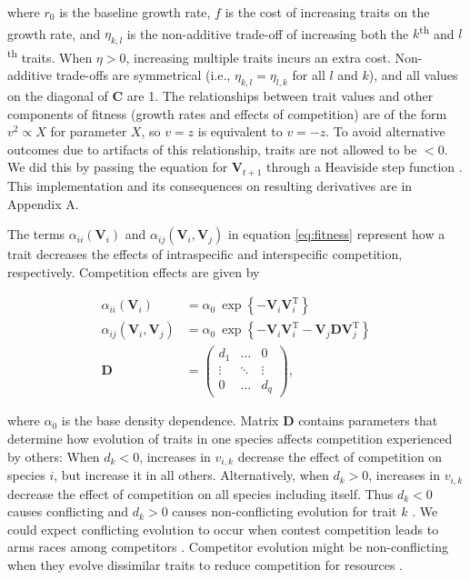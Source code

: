 \noindent where $r_0$ is the baseline growth rate,
$f$ is the cost of increasing traits on the growth rate, and
$\eta_{k,l}$ is the non-additive trade-off of increasing both the
$k$\textsuperscript{th} and $l$\textsuperscript{th} traits.
When $\eta > 0$, increasing multiple traits incurs an extra cost.
Non-additive trade-offs are symmetrical (i.e., $\eta_{k,l} = \eta_{l,k}$ for all
$l$ and $k$), and all values on the diagonal of $\mathbf{C}$ are 1.
The relationships between trait values and other components of fitness
(growth rates and effects of competition) are of the form
$v^2 \propto X$ for parameter $X$, so $v = z$ is equivalent to $v = -z$.
To avoid alternative outcomes due to artifacts of this relationship,
traits are not allowed to be $< 0$.
We did this by passing the equation for $\mathbf{V}_{t+1}$ through a
Heaviside step function \citep{Abramowitz:1948ha}.
This implementation and its consequences on resulting derivatives are in
Appendix A.


The terms $\alpha_{ii}(\mathbf{V}_i)$ and
$\alpha_{ij}(\mathbf{V}_i, \mathbf{V}_j)$
in equation \ref{eq:fitness} represent how a trait decreases the effects
of intraspecific and interspecific competition, respectively.
Competition effects are given by

\begin{equation} \label{eq:competition}
\begin{split}
    \alpha_{ii}(\mathbf{V}_i) &= \alpha_0 ~\exp \left\{- \mathbf{V}_i
        \mathbf{V}_i^{\textrm{T}} \right\} \\
    \alpha_{ij}(\mathbf{V}_i, \mathbf{V}_j) &= \alpha_0 ~\exp \left\{
        - \mathbf{V}_i \mathbf{V}_i^{\textrm{T}} -
        \mathbf{V}_j \mathbf{D} \mathbf{V}_j^{\textrm{T}} \right\} \\
    \mathbf{D} &= \begin{pmatrix}
        d_1     & \ldots    & 0 \\
        \vdots  & \ddots    & \vdots \\
        0       & \ldots    & d_q
        \end{pmatrix}
	\textrm{,}
\end{split}
\end{equation}

\noindent where $\alpha_0$ is the base density dependence.
Matrix $\mathbf{D}$ contains parameters that determine how evolution of traits
in one species affects competition experienced by others:
When $d_k < 0$, increases in $v_{i,k}$ decrease the
effect of competition on species $i$, but increase it in all others.
Alternatively, when $d_k > 0$, increases in $v_{i,k}$ decrease the effect of
competition on all species including itself.
Thus $d_k < 0$ causes conflicting and $d_k > 0$ causes non-conflicting evolution
for trait $k$ \citep{Northfield:2013if}.
We could expect conflicting evolution to occur when contest competition
leads to arms races among competitors
\citep{Abrams:1994th}.
Competitor evolution might be non-conflicting when they evolve
dissimilar traits to reduce competition for resources \citep{Roughgarden:1976eh}.


